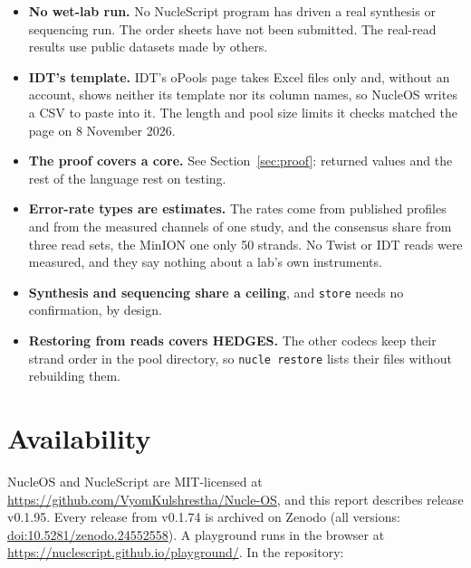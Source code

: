 \documentclass[11pt,a4paper]{article}
\newcommand{\nsl}[1]{\texttt{#1}}
\begin{document}
\begin{itemize}[leftmargin=*,itemsep=2pt]
\item \textbf{No wet-lab run.} No NucleScript program has driven a real
  synthesis or sequencing run. The order sheets have not been submitted.
  The real-read results use public datasets made by others.
\item \textbf{IDT's template.} IDT's oPools page takes Excel files only
  and, without an account, shows neither its template nor its column
  names, so NucleOS writes a CSV to paste into it. The length and pool
  size limits it checks matched the page on 8 November 2026.
\item \textbf{The proof covers a core.} See Section~\ref{sec:proof}:
  returned values and the rest of the language rest on testing.
\item \textbf{Error-rate types are estimates.} The rates come from
  published profiles and from the measured channels of one study, and the
  consensus share from three read sets, the MinION one only 50 strands.
  No Twist or IDT reads were measured, and they say nothing about a lab's
  own instruments.
\item \textbf{Synthesis and sequencing share a ceiling}, and
  \nsl{store} needs no confirmation, by design.
\item \textbf{Restoring from reads covers HEDGES.} The other codecs keep
  their strand order in the pool directory, so \nsl{nucle restore} lists
  their files without rebuilding them.
\end{itemize}

\section{Availability}

NucleOS and NucleScript are MIT-licensed at
\url{https://github.com/VyomKulshrestha/Nucle-OS}, and this report
describes release v0.1.95. Every release from v0.1.74 is archived on
Zenodo (all versions:
\href{https://doi.org/10.5281/zenodo.24552558}{doi:10.5281/zenodo.24552558}). A playground runs in the browser at
\url{https://nuclescript.github.io/playground/}. In the repository:
\end{document}
